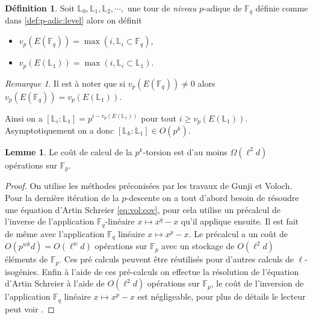 \documentclass[10pt,a4paper]{book}
\theoremstyle{plain}
\theoremstyle{definition}
\newtheorem{lem}[thm]{Lemme}
\theoremstyle{definition}
\theoremstyle{definition}
\theoremstyle{definition}
\newtheorem{defi}[thm]{Définition}
\theoremstyle{remark}
\newtheorem{rem}[thm]{Remarque}
\theoremstyle{remark}
\begin{document}

\begin{defi}
Soit $\mathbb{L}_0, \mathbb{L}_1, \mathbb{L}_2, \cdots, $ une tour de \emph{niveau} $p$-adique de $\mathbb{F}_q$ définie comme dans \ref{def:p-adic:level} alors on définit
\begin{itemize}
\item $v_p(E(\mathbb{F}_q))=\max\left( i, \mathbb{L}_i \subset \mathbb{F}_q \right)$,
\item $v_p(E(\mathbb{L}_1))=\max\left( i, \mathbb{L}_i \subset \mathbb{L}_1 \right)$.
\end{itemize}
\end{defi}

\begin{rem}
Il est à noter que si $v_p(E(\mathbb{F}_q)) \neq 0$ alors $v_p(E(\mathbb{F}_q))=v_p(E(\mathbb{L}_1))$.
\end{rem}

Ainsi on a $[\mathbb{L}_i:\mathbb{L}_1]=p^{i- v_p(E(\mathbb{L}_1))}$ pour tout $i \geqslant  v_p(E(\mathbb{L}_1))$. Asymptotiquement on a donc $[\mathbb{L}_k:\mathbb{L}_1] \in O(p^k)$.


\begin{lem}
Le coût de calcul de la $p^k$-torsion est d'au moins $\Omega(\ell^2d)$ opérations sur $\mathbb{F}_p$.
\end{lem}

\begin{proof}
On utilise les méthodes préconisées par les travaux de Gunji et Voloch. Pour la dernière itération de la $p$-descente on a tout d'abord besoin de résoudre une équation d'Artin Schreier \eqref{eq:vol:cov}, pour cela \cite{Couveignes96} utilise un précalcul de l'inverse de l'application $\mathbb{F}_q$-linéaire  $x \mapsto x^q-x$ qu'il applique ensuite. Il est fait de même avec l'application $\mathbb{F}_q$ linéaire $x \mapsto x^p - x$. Le précalcul a un coût de $O(p^{wk}d)=O(\ell^{w}d)$ opérations sur $\mathbb{F}_p$ avec un stockage de $O(\ell^2d)$ éléments de $\mathbb{F}_p$.
Ces pré calculs peuvent être réutilisés pour d'autres calculs de $\ell$-isogénies.
Enfin à l'aide de ces pré-calculs on effectue la résolution de l'équation d'Artin Schreier à l'aide de $O(\ell^2 d)$ opérations sur $\mathbb{F}_p$, le coût de l'inversion de l'application $\mathbb{F}_q$ linéaire $x \mapsto x^p - x$ est négligeable, pour plus de détails le lecteur peut voir \cite[§2.4]{Couveignes96}.
\end{proof}
\end{document}
